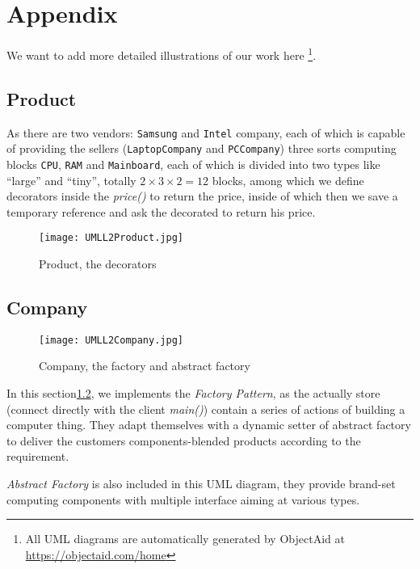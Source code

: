 \documentclass[a4paper]{article}
\begin{document}
\section{Appendix}%
\label{sec:appendix}

We want to add more detailed illustrations of our work here
\footnote{All UML diagrams are automatically generated by ObjectAid at \url{https://objectaid.com/home}}.

\subsection{Product}%
\label{sub:product}

As there are two vendors: \texttt{Samsung} and \texttt{Intel} company,
each of which is capable of providing the sellers (\texttt{LaptopCompany} and
\texttt{PCCompany}) three sorts computing blocks \texttt{CPU}, \texttt{RAM}
and \texttt{Mainboard}, each of which is divided into two types like
``large'' and ``tiny'', totally $2 \times 3 \times 2 = 12$ blocks, among
which we define decorators inside the \textsl{price()} to return the price, inside
of which then we save a temporary reference and ask the decorated to return his price.

\begin{figure}[h]
    \centering
    \texttt{[image: UMLL2Product.jpg]}
    \caption{Product, the decorators}
    \label{fig:product}
\end{figure}

\subsection{Company}%
\label{sub:company}

\begin{figure}[h]
    \centering
    \texttt{[image: UMLL2Company.jpg]}
    \caption{Company, the factory and abstract factory}
    \label{fig:company}
\end{figure}

In this section\ref{sub:company}, we implements the \textit{Factory Pattern},
as the actually store (connect directly with the client \textsl{main()})
contain a series of actions of building a computer thing. They adapt themselves
with a dynamic setter of abstract factory to deliver the customers
components-blended products according to the requirement.

\textit{Abstract Factory} is also included in this UML diagram,
they provide brand-set computing components with multiple interface
aiming at various types.
\end{document}
